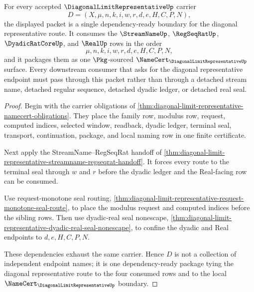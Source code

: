 \begin{theorem}
\label{thm:diagonal-limit-representative-dependency-ready-package}
For every accepted $\DiagonalLimitRepresentativeUp$ carrier
$$
D=(X,\mu,n,k,i,w,r,d,e,H,C,P,N),
$$
the displayed packet is a single dependency-ready boundary for the diagonal representative route. It consumes the $\StreamNameUp$, $\RegSeqRatUp$, $\DyadicRatCoreUp$, and $\RealUp$ rows in the order
$$
\mu,n,k,i,w,r,d,e,H,C,P,N,
$$
and it packages them as one $\Pkg$-sourced $\NameCert_{\DiagonalLimitRepresentativeUp}$ surface. Every downstream consumer that asks for the diagonal representative endpoint must pass through this packet rather than through a detached stream name, detached regular sequence, detached dyadic ledger, or detached real seal.
\end{theorem}
\begin{proof}
Begin with the carrier obligations of \autoref{thm:diagonal-limit-representative-namecert-obligations}. They place the family row, modulus row, request, computed indices, selected window, readback, dyadic ledger, terminal seal, transport, continuation, package, and local naming row in one finite certificate.

Next apply the StreamName--RegSeqRat handoff of \autoref{thm:diagonal-limit-representative-streamname-regseqrat-handoff}. It forces every route to the terminal seal through $w$ and $r$ before the dyadic ledger and the Real-facing row can be consumed.

Use request-monotone seal routing, \autoref{thm:diagonal-limit-representative-request-monotone-seal-route}, to place the modulus request and computed indices before the sibling rows. Then use dyadic-real seal nonescape, \autoref{thm:diagonal-limit-representative-dyadic-real-seal-nonescape}, to confine the dyadic and Real endpoints to $d,e,H,C,P,N$.

These dependencies exhaust the same carrier. Hence $D$ is not a collection of independent endpoint names; it is one dependency-ready package tying the diagonal representative route to the four consumed rows and to the local $\NameCert_{\DiagonalLimitRepresentativeUp}$ boundary.
\end{proof}

